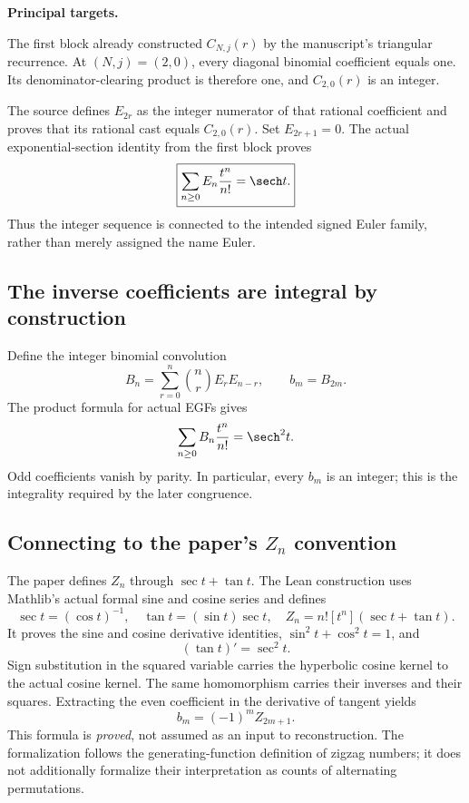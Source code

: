 \textbf{Principal targets.}\par
{}\par
{}\par
{}
\par\medskip
{}
The first block already constructed $C_{N,j}(r)$ by the manuscript's triangular recurrence. At $(N,j)=(2,0)$, every diagonal binomial coefficient equals one. Its denominator-clearing product is therefore one, and $C_{2,0}(r)$ is an integer.

The source defines $E_{2r}$ as the integer numerator of that rational coefficient and proves that its rational cast equals $C_{2,0}(r)$. Set $E_{2r+1}=0$. The actual exponential-section identity from the first block proves
\[
 \boxed{\sum_{n\ge0}E_n\frac{t^n}{n!}=\sech t.}
\]
Thus the integer sequence is connected to the intended signed Euler family, rather than merely assigned the name Euler.

\subsection*{The inverse coefficients are integral by construction}
Define the integer binomial convolution
\[
 B_n=\sum_{r=0}^{n}\binom nr E_rE_{n-r},\qquad b_m=B_{2m}.
\]
The product formula for actual EGFs gives
\[
 \sum_{n\ge0}B_n\frac{t^n}{n!}=\sech^2 t.
\]
Odd coefficients vanish by parity. In particular, every $b_m$ is an integer; this is the integrality required by the later congruence.

\subsection*{Connecting to the paper's $Z_n$ convention}
The paper defines $Z_n$ through $\sec t+\tan t$. The Lean construction uses Mathlib's actual formal sine and cosine series and defines
\[
 \sec t=(\cos t)^{-1},\quad \tan t=(\sin t)\sec t,
 \quad Z_n=n![t^n](\sec t+\tan t).
\]
It proves the sine and cosine derivative identities, $\sin^2t+\cos^2t=1$, and
\[
 (\tan t)'=\sec^2t.
\]
Sign substitution in the squared variable carries the hyperbolic cosine kernel to the actual cosine kernel. The same homomorphism carries their inverses and their squares. Extracting the even coefficient in the derivative of tangent yields
\[
 \boxed{b_m=(-1)^m Z_{2m+1}.}
\]
This formula is \emph{proved}, not assumed as an input to reconstruction. The formalization follows the generating-function definition of zigzag numbers; it does not additionally formalize their interpretation as counts of alternating permutations.

